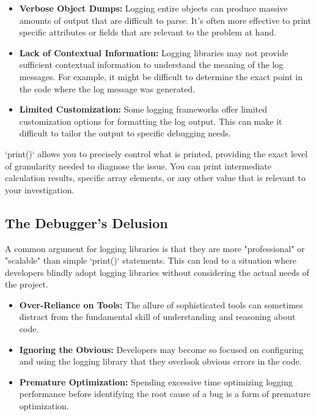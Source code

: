 \documentclass{article}
\begin{document}
{{{{\begin{itemize}
    \itemsep0em
    \item \textbf{Verbose Object Dumps:} Logging entire objects can produce massive amounts of output that are difficult to parse. It's often more effective to print specific attributes or fields that are relevant to the problem at hand.
    \item \textbf{Lack of Contextual Information:} Logging libraries may not provide sufficient contextual information to understand the meaning of the log messages. For example, it might be difficult to determine the exact point in the code where the log message was generated.
    \item \textbf{Limited Customization:} Some logging frameworks offer limited customization options for formatting the log output. This can make it difficult to tailor the output to specific debugging needs.
\end{itemize}

`print()` allows you to precisely control what is printed, providing the exact level of granularity needed to diagnose the issue. You can print intermediate calculation results, specific array elements, or any other value that is relevant to your investigation.

\subsection*{The Debugger's Delusion}

A common argument for logging libraries is that they are more "professional" or "scalable" than simple `print()` statements. This can lead to a situation where developers blindly adopt logging libraries without considering the actual needs of the project.

\begin{itemize}
    \itemsep0em
    \item \textbf{Over-Reliance on Tools:}  The allure of sophisticated tools can sometimes distract from the fundamental skill of understanding and reasoning about code.
    \item \textbf{Ignoring the Obvious:} Developers may become so focused on configuring and using the logging library that they overlook obvious errors in the code.
    \item \textbf{Premature Optimization:} Spending excessive time optimizing logging performance before identifying the root cause of a bug is a form of premature optimization.
\end{itemize}

}}}}
\end{document}
